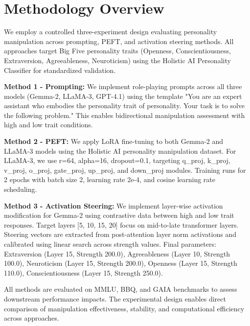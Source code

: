 \section{Methodology Overview}

We employ a controlled three-experiment design evaluating personality manipulation across prompting, PEFT, and activation steering methods. All approaches target Big Five personality traits (Openness, Conscientiousness, Extraversion, Agreeableness, Neuroticism) using the Holistic AI Personality Classifier for standardized validation.

\textbf{Method 1 - Prompting:} We implement role-playing prompts across all three models (Gemma-2, LLaMA-3, GPT-4.1) using the template "You are an expert assistant who embodies the personality trait of {personality}. Your task is to solve the following problem." This enables bidirectional manipulation assessment with high and low trait conditions.

\textbf{Method 2 - PEFT:} We apply LoRA fine-tuning to both Gemma-2 and LLaMA-3 models using the Holistic AI personality manipulation dataset. For LLaMA-3, we use r=64, alpha=16, dropout=0.1, targeting q\_proj, k\_proj, v\_proj, o\_proj, gate\_proj, up\_proj, and down\_proj modules. Training runs for 2 epochs with batch size 2, learning rate 2e-4, and cosine learning rate scheduling.

\textbf{Method 3 - Activation Steering:} We implement layer-wise activation modification for Gemma-2 using contrastive data between high and low trait responses. Target layers [5, 10, 15, 20] focus on mid-to-late transformer layers. Steering vectors are extracted from post-attention layer norm activations and calibrated using linear search across strength values. Final parameters: Extraversion (Layer 15, Strength 200.0), Agreeableness (Layer 10, Strength 100.0), Neuroticism (Layer 15, Strength 200.0), Openness (Layer 15, Strength 110.0), Conscientiousness (Layer 15, Strength 250.0).

All methods are evaluated on MMLU, BBQ, and GAIA benchmarks to assess downstream performance impacts. The experimental design enables direct comparison of manipulation effectiveness, stability, and computational efficiency across approaches.
